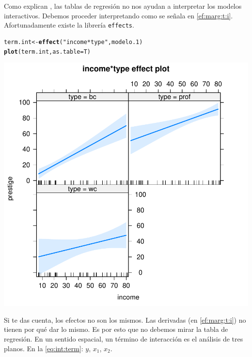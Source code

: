 \documentclass[onesided]{article}\usepackage[]{graphicx}\usepackage[]{color}
\makeatletter
\def\maxwidth{ %
  \ifdim\Gin@nat@width>\linewidth
    \linewidth
  \else
    \Gin@nat@width
  \fi
}
\newcommand{\hlstr}[1]{\textcolor[rgb]{0.192,0.494,0.8}{#1}}%
\newcommand{\hlstd}[1]{\textcolor[rgb]{0.345,0.345,0.345}{#1}}%
\newcommand{\hlkwb}[1]{\textcolor[rgb]{0.69,0.353,0.396}{#1}}%
\newcommand{\hlkwc}[1]{\textcolor[rgb]{0.333,0.667,0.333}{#1}}%
\newcommand{\hlkwd}[1]{\textcolor[rgb]{0.737,0.353,0.396}{\textbf{#1}}}%
\newenvironment{kframe}{%
 \def\at@end@of@kframe{}%
 \ifinner\ifhmode%
  \def\at@end@of@kframe{\end{minipage}}%
  \begin{minipage}{\columnwidth}%
 \fi\fi%
 \def\FrameCommand##1{\hskip\@totalleftmargin \hskip-\fboxsep
 \colorbox{shadecolor}{##1}\hskip-\fboxsep
     \hskip-\linewidth \hskip-\@totalleftmargin \hskip\columnwidth}%
 \MakeFramed {\advance\hsize-\width
   \@totalleftmargin\z@ \linewidth\hsize
   \@setminipage}}%
 {\par\unskip\endMakeFramed%
 \at@end@of@kframe}
\newenvironment{knitrout}{}{} %
\makeatother
\begin{document}
Como explican \textcite{Brambor2006}, las tablas de regresi\'on no nos ayudan a interpretar los modelos interactivos. Debemos proceder interpretando como se se\~nala en \autoref{ef:marg:t:i}. Afortunadamente existe la librer\'ia \texttt{effects}.


\begin{knitrout}
\color{fgcolor}\begin{kframe}
\begin{alltt}
\hlstd{term.int} \hlkwb{<-} \hlkwd{effect}\hlstd{(}\hlstr{"income*type"}\hlstd{, modelo.1)}
\hlkwd{plot}\hlstd{(term.int,} \hlkwc{as.table}\hlstd{=T)}
\end{alltt}
\end{kframe}

{\centering \includegraphics[width=\maxwidth]{figure/i:c:3-1} 

}



\end{knitrout}


Si te das cuenta, los efectos no son los mismos. Las derivadas (en \autoref{ef:marg:t:i}) no tienen por qu\'e dar lo mismo. Es por esto que no debemos mirar la tabla de regresi\'on. En un sentido espacial, un t\'ermino de interacci\'on es el an\'alisis de tres planos. En la \autoref{eq:int:term}: $y$, $x_{1}$, $x_{2}$. 
\end{document}
